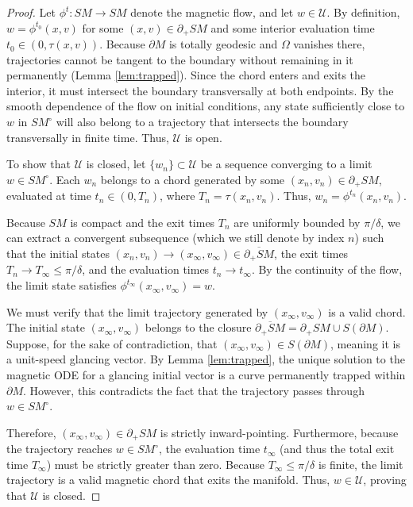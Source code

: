 \documentclass[12pt]{amsart}
\numberwithin{equation}{section}
\begin{document}
\begin{proof}
Let $\phi^t: SM \to SM$ denote the magnetic flow, and let $w \in \mathcal{U}$. By definition, $w = \phi^{t_0}(x,v)$ for some $(x,v) \in \partial_+ SM$ and some interior evaluation time $t_0 \in (0, \tau(x,v))$. Because $\partial M$ is totally geodesic and $\Omega$ vanishes there, trajectories cannot be tangent to the boundary without remaining in it permanently (Lemma \ref{lem:trapped}). Since the chord enters and exits the interior, it must intersect the boundary transversally at both endpoints. By the smooth dependence of the flow on initial conditions, any state sufficiently close to $w$ in $SM^\circ$ will also belong to a trajectory that intersects the boundary transversally in finite time. Thus, $\mathcal{U}$ is open.

To show that $\mathcal{U}$ is closed, let $\{w_n\} \subset \mathcal{U}$ be a sequence  converging to a limit $w \in SM^\circ$. Each $w_n$ belongs to a chord generated by some $(x_n, v_n) \in \partial_+ SM$, evaluated at time $t_n \in (0, T_n)$, where $T_n = \tau(x_n, v_n)$. Thus, $w_n = \phi^{t_n}(x_n, v_n)$.

Because $SM$ is compact and the exit times $T_n$ are uniformly bounded by $\pi / \delta$, we can extract a convergent subsequence (which we still denote by index $n$) such that the initial states $(x_n, v_n) \to (x_\infty, v_\infty) \in \overline{\partial_+ SM}$, the exit times $T_n \to T_\infty \le \pi / \delta$, and the evaluation times $t_n \to t_\infty$. By the continuity of the flow, the limit state satisfies $\phi^{t_\infty}(x_\infty, v_\infty) = w$.

We must verify that the limit trajectory generated by $(x_\infty, v_\infty)$ is a valid chord. The initial state $(x_\infty, v_\infty)$ belongs to the closure $\overline{\partial_+ SM} = \partial_+ SM \cup S(\partial M)$. Suppose, for the sake of contradiction, that $(x_\infty, v_\infty) \in S(\partial M)$, meaning it is a unit-speed glancing vector. By Lemma \ref{lem:trapped}, the unique solution to the magnetic ODE for a glancing initial vector is a curve permanently trapped within $\partial M$. However, this contradicts the fact that the trajectory passes through $w \in SM^\circ$.

Therefore, $(x_\infty, v_\infty) \in \partial_+ SM$ is strictly inward-pointing. Furthermore, because the trajectory reaches $w \in SM^\circ$, the evaluation time $t_\infty$ (and thus the total exit time $T_\infty$) must be strictly greater than zero. Because $T_\infty \le \pi/\delta$ is finite, the limit trajectory is a valid magnetic chord that exits the manifold. Thus, $w \in \mathcal{U}$, proving that $\mathcal{U}$ is closed.
\end{proof}
\end{document}
